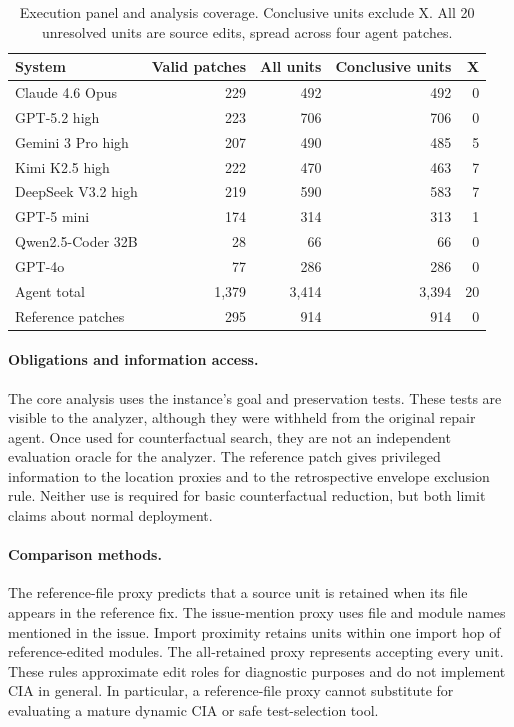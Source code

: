 \documentclass[a4paper,fleqn]{cas-sc}
\newcommand{\lab}[1]{\textsf{#1}}
\begin{document}
\begin{table}[pos=htbp]
\caption{Execution panel and analysis coverage. Conclusive units exclude \lab{X}. All 20 unresolved units are source edits, spread across four agent patches.}
\label{tab:panel}
\centering\small
\begin{tabular}{lrrrr}
\toprule
System & Valid patches & All units & Conclusive units & \lab{X} \\
\midrule
Claude 4.6 Opus & 229 & 492 & 492 & 0 \\
GPT-5.2 high & 223 & 706 & 706 & 0 \\
Gemini 3 Pro high & 207 & 490 & 485 & 5 \\
Kimi K2.5 high & 222 & 470 & 463 & 7 \\
DeepSeek V3.2 high & 219 & 590 & 583 & 7 \\
GPT-5 mini & 174 & 314 & 313 & 1 \\
Qwen2.5-Coder 32B & 28 & 66 & 66 & 0 \\
GPT-4o & 77 & 286 & 286 & 0 \\
\midrule
Agent total & 1,379 & 3,414 & 3,394 & 20 \\
Reference patches & 295 & 914 & 914 & 0 \\
\bottomrule
\end{tabular}
\end{table}

\paragraph{Obligations and information access.}
The core analysis uses the instance's goal and preservation tests. These tests are visible to the analyzer, although they were withheld from the original repair agent. Once used for counterfactual search, they are not an independent evaluation oracle for the analyzer. The reference patch gives privileged information to the location proxies and to the retrospective envelope exclusion rule. Neither use is required for basic counterfactual reduction, but both limit claims about normal deployment.

\paragraph{Comparison methods.}
The reference-file proxy predicts that a source unit is retained when its file appears in the reference fix. The issue-mention proxy uses file and module names mentioned in the issue. Import proximity retains units within one import hop of reference-edited modules. The all-retained proxy represents accepting every unit. These rules approximate edit roles for diagnostic purposes and do not implement CIA in general. In particular, a reference-file proxy cannot substitute for evaluating a mature dynamic CIA or safe test-selection tool.
\end{document}
